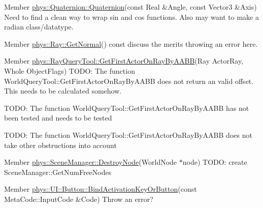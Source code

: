 \label{todo__todo000017}
\hypertarget{todo__todo000017}{}
 
\begin{DoxyDescription}
\item[Member \hyperlink{classphys_1_1Quaternion_a9246247b7b28f19839148415a7ddeb96}{phys::Quaternion::Quaternion}(const Real \&Angle, const Vector3 \&Axis) ]Need to find a clean way to wrap sin and cos functions. Also may want to make a radian class/datatype. 
\end{DoxyDescription}

\label{todo__todo000018}
\hypertarget{todo__todo000018}{}
 
\begin{DoxyDescription}
\item[Member \hyperlink{classphys_1_1Ray_a7445c25acb6ce865ef85e7ada829ccba}{phys::Ray::GetNormal}() const  ]discuss the merits throwing an error here. 
\end{DoxyDescription}

\label{todo__todo000019}
\hypertarget{todo__todo000019}{}
 
\begin{DoxyDescription}
\item[Member \hyperlink{classphys_1_1RayQueryTool_af4bba2ed8f201d4b0e9a05728d8bd1b6}{phys::RayQueryTool::GetFirstActorOnRayByAABB}(Ray ActorRay, Whole ObjectFlags) ]TODO: The function WorldQueryTool::GetFirstActorOnRayByAABB does not return an valid offset. This needs to be calculated somehow. 

TODO: The function WorldQueryTool::GetFirstActorOnRayByAABB has not been tested and needs to be tested 

TODO: The function WorldQueryTool::GetFirstActorOnRayByAABB does not take other obstructions into account 
\end{DoxyDescription}

\label{todo__todo000022}
\hypertarget{todo__todo000022}{}
 
\begin{DoxyDescription}
\item[Member \hyperlink{classphys_1_1SceneManager_a5a2d68ab38308f9c6ac4b659cae36dee}{phys::SceneManager::DestroyNode}(WorldNode $\ast$node) ]TODO: create SceneManager::GetNumFreeNodes 
\end{DoxyDescription}

\label{todo__todo000023}
\hypertarget{todo__todo000023}{}
 
\begin{DoxyDescription}
\item[Member \hyperlink{classphys_1_1UI_1_1Button_a3b51fa981fdf869240bff082bafb56a9}{phys::UI::Button::BindActivationKeyOrButton}(const MetaCode::InputCode \&Code) ]Throw an error? 
\end{DoxyDescription}

